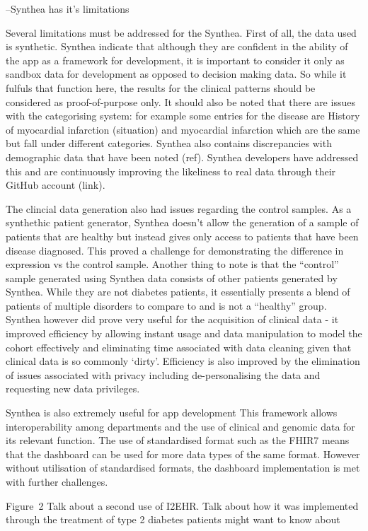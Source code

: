 \documentclass{bioinfo}
\begin{document}
\begin{Discussion}
--Synthea has it’s limitations

Several limitations must be addressed for the Synthea. First of all, the data used is synthetic. Synthea indicate that although they are confident in the ability of the app as a framework for development, it is important to consider it only as sandbox data for development as opposed to decision making data. So while it fulfuls that function here, the results for the clinical patterns should be considered as proof-of-purpose only. It should also be noted that there are issues with the categorising system: for example some entries for the disease are History of myocardial infarction (situation) and myocardial infarction which are the same but fall under different 
categories. Synthea also contains discrepancies with demographic data that have been noted (ref). Synthea developers have addressed this and are continuously improving the likeliness to real data through their GitHub account (link). 

The clincial data generation also had issues regarding the control samples. As a synthethic patient generator, Synthea doesn’t allow the generation of a sample of patients that are healthy but instead gives only access to patients that have been disease diagnosed. This proved a challenge for demonstrating the difference in expression vs the control sample. Another thing to note is that the “control” sample generated using Synthea data consists of other patients generated by Synthea. While they are not diabetes patients, it essentially presents a blend of patients of multiple disorders to compare to and is not a “healthy” group. Synthea however did prove very useful for the acquisition of clinical data - it improved efficiency by allowing instant usage and data manipulation to model the cohort effectively and eliminating time associated with data cleaning given that clinical data is so commonly ‘dirty’. Efficiency is also improved by the elimination of issues associated with privacy including de-personalising the data and requesting new data privileges.


Synthea is also extremely useful for app development
This framework allows interoperability among departments and the use of clinical and genomic data for its relevant function. The use of standardised format such as the FHIR7 means that the dashboard can be used for more data types of the same format. However without utilisation of standardised formats, the dashboard implementation is met with further challenges. 


Figure~2\vphantom{\ref{fig:02}} Talk about a second use of I2EHR. Talk about how it was implemented through the treatment of type 2 diabetes patients \citealp{Boffelli03} might want to know about 





\end{Discussion}
\end{document}
